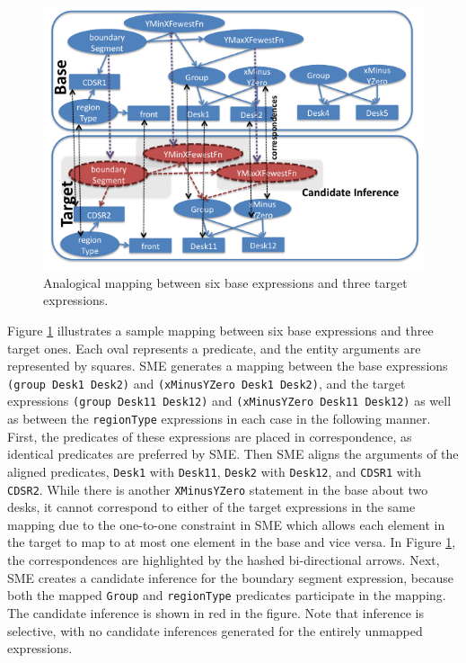 \documentclass[letterpaper]{article}
\newcommand{\fw}[1]{\texttt{#1}}
\begin{document}
\begin{figure}[h]
  \includegraphics[width=\columnwidth]{images/AnalogyDiagram.png}
  \caption{Analogical mapping between six base expressions and three target expressions. }
  
  \label{fig:analogy}
\end{figure}


Figure \ref{fig:analogy} illustrates a sample mapping between six base expressions and three target ones. Each oval represents a predicate, and the entity arguments are represented by squares. SME generates a mapping between the base expressions \fw{(group Desk1 Desk2)} and  \fw{(xMinusYZero Desk1 Desk2)}, and the  target expressions \fw{(group Desk11 Desk12)} and \fw{(xMinusYZero Desk11 Desk12)} as well as between the \fw{regionType} expressions in each case in the following manner. First, the predicates of these expressions are placed in correspondence, as identical predicates are preferred by SME. Then SME aligns the arguments of the aligned predicates, \fw{Desk1} with \fw{Desk11},  \fw{Desk2} with \fw{Desk12}, and \fw{CDSR1} with \fw{CDSR2}. While there is another \fw{XMinusYZero} statement in the base about two desks, it cannot correspond to either of the target expressions in the same mapping due to the one-to-one constraint in SME which allows each element in the target to map to at most one element in the base and vice versa. In Figure \ref{fig:analogy}, the correspondences are highlighted by the hashed bi-directional arrows. Next, SME creates a candidate inference for the boundary segment expression, because both the mapped \fw{Group} and \fw{regionType} predicates participate in the mapping. The candidate inference is shown in red in the figure. Note that inference is selective, with no candidate inferences generated for the entirely unmapped expressions. %
 
\end{document}
